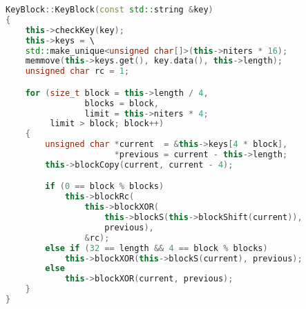 \begin{lstlisting}[language=c++, caption={Класс, реализующий получение
                                          раундовых ключей}]
KeyBlock::KeyBlock(const std::string &key)
{
    this->checkKey(key);
    this->keys = \
    std::make_unique<unsigned char[]>(this->niters * 16);
    memmove(this->keys.get(), key.data(), this->length);
    unsigned char rc = 1;

    for (size_t block = this->length / 4,
                blocks = block,
                limit = this->niters * 4;
         limit > block; block++)
    {
        unsigned char *current  = &this->keys[4 * block],
                      *previous = current - this->length;
        this->blockCopy(current, current - 4);

        if (0 == block % blocks)
            this->blockRc(
                this->blockXOR(
                    this->blockS(this->blockShift(current)),
                    previous),
                &rc);
        else if (32 == length && 4 == block % blocks)
            this->blockXOR(this->blockS(current), previous);
        else
            this->blockXOR(current, previous);
    }
}
\end{lstlisting}

